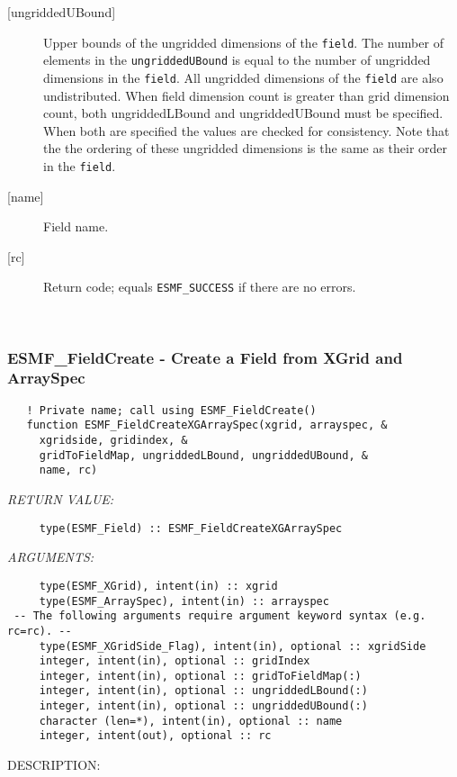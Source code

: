 \begin{description}
   \item [{[ungriddedUBound]}]
   Upper bounds of the ungridded dimensions of the {\tt field}.
   The number of elements in the {\tt ungriddedUBound} is equal to the number of ungridded
   dimensions in the {\tt field}. All ungridded dimensions of the
   {\tt field} are also undistributed. When field dimension count is
   greater than grid dimension count, both ungriddedLBound and ungriddedUBound
   must be specified. When both are specified the values are checked
   for consistency. Note that the the ordering of
   these ungridded dimensions is the same as their order in the {\tt field}.
   \item [{[name]}]
   Field name.
   \item [{[rc]}]
   Return code; equals {\tt ESMF\_SUCCESS} if there are no errors.
   \end{description} 
 
\mbox{}\hrulefill\ 
 
\subsubsection [ESMF\_FieldCreate] {ESMF\_FieldCreate - Create a Field from XGrid and ArraySpec}


\begin{verbatim}   ! Private name; call using ESMF_FieldCreate()
   function ESMF_FieldCreateXGArraySpec(xgrid, arrayspec, &
     xgridside, gridindex, &
     gridToFieldMap, ungriddedLBound, ungriddedUBound, &
     name, rc)\end{verbatim}{\em RETURN VALUE:}
\begin{verbatim}     type(ESMF_Field) :: ESMF_FieldCreateXGArraySpec\end{verbatim}{\em ARGUMENTS:}
\begin{verbatim}     type(ESMF_XGrid), intent(in) :: xgrid
     type(ESMF_ArraySpec), intent(in) :: arrayspec
 -- The following arguments require argument keyword syntax (e.g. rc=rc). --
     type(ESMF_XGridSide_Flag), intent(in), optional :: xgridSide
     integer, intent(in), optional :: gridIndex
     integer, intent(in), optional :: gridToFieldMap(:)
     integer, intent(in), optional :: ungriddedLBound(:)
     integer, intent(in), optional :: ungriddedUBound(:)
     character (len=*), intent(in), optional :: name
     integer, intent(out), optional :: rc\end{verbatim}
{\sf DESCRIPTION:\\ }


